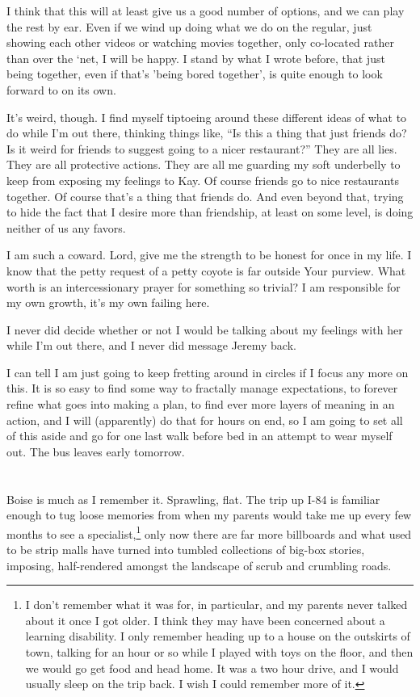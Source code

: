 I think that this will at least give us a good number of options, and we can play the rest by ear. Even if we wind up doing what we do on the regular, just showing each other videos or watching movies together, only co-located rather than over the `net, I will be happy. I stand by what I wrote before, that just being together, even if that's 'being bored together', is quite enough to look forward to on its own.

It's weird, though. I find myself tiptoeing around these different ideas of what to do while I'm out there, thinking things like, ``Is this a thing that just friends do? Is it weird for friends to suggest going to a nicer restaurant?'' They are all lies. They are all protective actions. They are all me guarding my soft underbelly to keep from exposing my feelings to Kay. Of course friends go to nice restaurants together. Of course that's a thing that friends do. And even beyond that, trying to hide the fact that I desire more than friendship, at least on some level, is doing neither of us any favors.

I am such a coward. Lord, give me the strength to be honest for once in my life. I know that the petty request of a petty coyote is far outside Your purview. What worth is an intercessionary prayer for something so trivial? I am responsible for my own growth, it's my own failing here.

I never did decide whether or not I would be talking about my feelings with her while I'm out there, and I never did message Jeremy back.

I can tell I am just going to keep fretting around in circles if I focus any more on this. It is so easy to find some way to fractally manage expectations, to forever refine what goes into making a plan, to find ever more layers of meaning in an action, and I will (apparently) do that for hours on end, so I am going to set all of this aside and go for one last walk before bed in an attempt to wear myself out. The bus leaves early tomorrow.

\section{}

Boise is much as I remember it. Sprawling, flat. The trip up I-84 is familiar enough to tug loose memories from when my parents would take me up every few months to see a specialist,\footnote{I don't remember what it was for, in particular, and my parents never talked about it once I got older. I think they may have been concerned about a learning disability. I only remember heading up to a house on the outskirts of town, talking for an hour or so while I played with toys on the floor, and then we would go get food and head home. It was a two hour drive, and I would usually sleep on the trip back. I wish I could remember more of it.} only now there are far more billboards and what used to be strip malls have turned into tumbled collections of big-box stories, imposing, half-rendered amongst the landscape of scrub and crumbling roads.

